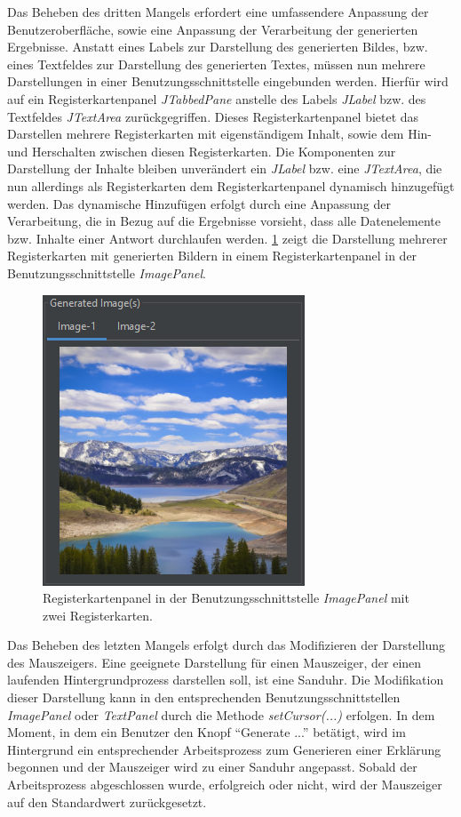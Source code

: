 Das Beheben des dritten Mangels erfordert eine umfassendere Anpassung der Benutzeroberfläche, sowie eine Anpassung der Verarbeitung der generierten Ergebnisse.
Anstatt eines Labels zur Darstellung des generierten Bildes, bzw. eines Textfeldes zur Darstellung des generierten Textes, müssen nun mehrere Darstellungen in einer Benutzungsschnittstelle eingebunden werden.
Hierfür wird auf ein Registerkartenpanel \textit{JTabbedPane} anstelle des Labels \textit{JLabel} bzw. des Textfeldes \textit{JTextArea} zurückgegriffen.
Dieses Registerkartenpanel bietet das Darstellen mehrere Registerkarten mit eigenständigem Inhalt, sowie dem Hin- und Herschalten zwischen diesen Registerkarten.
Die Komponenten zur Darstellung der Inhalte bleiben unverändert ein \textit{JLabel} bzw. eine \textit{JTextArea}, die nun allerdings als Registerkarten dem Registerkartenpanel dynamisch hinzugefügt werden.
Das dynamische Hinzufügen erfolgt durch eine Anpassung der Verarbeitung, die in Bezug auf die Ergebnisse vorsieht, dass alle Datenelemente bzw. Inhalte einer Antwort durchlaufen werden.
\cref{sec5:eval:subsec:adaptation:fig:tabbedpane-image} zeigt die Darstellung mehrerer Registerkarten mit generierten Bildern in einem Registerkartenpanel in der Benutzungsschnittstelle \textit{ImagePanel}.

\begin{figure}[!ht]
  \includegraphics{chapter/chapter_5/tabbedpane-image}
  \caption{Registerkartenpanel in der Benutzungsschnittstelle \textit{ImagePanel} mit zwei Registerkarten.}
  \label{sec5:eval:subsec:adaptation:fig:tabbedpane-image}
\end{figure}

Das Beheben des letzten Mangels erfolgt durch das Modifizieren der Darstellung des Mauszeigers.
Eine geeignete Darstellung für einen Mauszeiger, der einen laufenden Hintergrundprozess darstellen soll, ist eine Sanduhr.
Die Modifikation dieser Darstellung kann in den entsprechenden Benutzungsschnittstellen \textit{ImagePanel} oder \textit{TextPanel} durch die Methode \textit{setCursor(...)} erfolgen.
In dem Moment, in dem ein Benutzer den Knopf \enquote{Generate ...} betätigt, wird im Hintergrund ein entsprechender Arbeitsprozess zum Generieren einer Erklärung begonnen und der Mauszeiger wird zu einer Sanduhr angepasst.
Sobald der Arbeitsprozess abgeschlossen wurde, erfolgreich oder nicht, wird der Mauszeiger auf den Standardwert zurückgesetzt.

